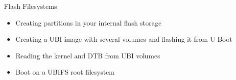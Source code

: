 \setuplabframe
{Flash Filesystems}
{
  \begin{itemize}
  \item Creating partitions in your internal flash storage
  \item Creating a UBI image with several volumes and flashing it from
    U-Boot
  \item Reading the kernel and DTB from UBI volumes
  \item Boot on a UBIFS root filesystem
  \end{itemize}
}
